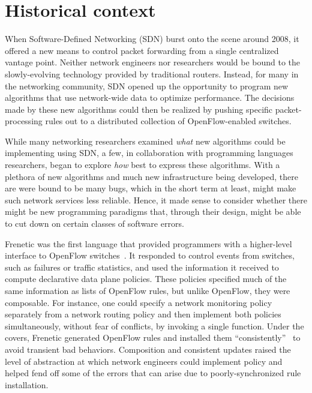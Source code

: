 \documentclass[sigconf]{acmart}
\begin{document}
\section{Historical context}

When Software-Defined Networking (SDN) burst onto the scene around 2008,
it offered a new means to control packet forwarding  from a single
centralized vantage point.  Neither network engineers nor 
researchers would be bound to the slowly-evolving technology provided by
traditional routers.  Instead, for many in the networking
community, SDN opened up the opportunity to program new
algorithms that use network-wide data to optimize performance.
The decisions made by these new algorithms could then be realized by
pushing specific packet-processing rules out to a distributed
collection of  OpenFlow-enabled switches.

While many networking researchers examined \emph{what} new algorithms
could be implementing using SDN, a few, in collaboration
with programming languages researchers, began to explore \emph{how}
best to express these algorithms.  With a plethora of new algorithms
and much new infrastructure being developed, there are were bound to
be many bugs, which in the short term at least, might make such network
services less reliable.  Hence, it made sense to consider
whether there might be new programming paradigms that, through their
design, might be able to cut down on certain classes of software
errors.

Frenetic was the first language that provided programmers with
a higher-level interface to OpenFlow switches~\cite{frenetic}.  It responded to control
events from switches, such as failures or traffic statistics, and used
the information it received to compute declarative data plane
policies.  These policies specified much of the same information as
lists of OpenFlow rules, but unlike OpenFlow, they were composable.  For
instance, one could specify a network monitoring policy separately
from a network routing policy and then implement both policies
simultaneously, without fear of conflicts, by invoking a single
function.  Under the covers, Frenetic 
generated OpenFlow rules and installed them
``consistently''~\cite{consistent-updates} to avoid transient bad
behaviors.  Composition and consistent updates
raised the level of abstraction at which
network engineers could implement policy and helped fend off some of
the errors that can arise due to poorly-synchronized rule installation.
\end{document}
